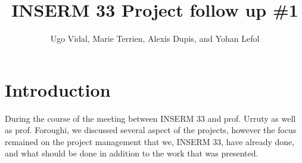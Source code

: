 \documentclass[11pt]{article}
\author{Ugo Vidal, Marie Terrien, Alexis Dupis, and Yohan Lefol}
\title{INSERM 33 Project follow up \#1}
\begin{document}
\maketitle

\section{Introduction}
During the course of the meeting between INSERM 33 and prof. Urruty as well as prof. Foroughi, we discussed several aspect of the projects, however the focus remained on the project management that we, INSERM 33, have already done, and what should be done in addition to the work that was presented.





\end{document}
